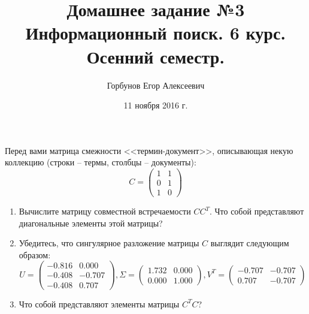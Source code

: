 
\makeatletter
{}
\makeatother
\graphicspath{{./pics/}}

\title{Домашнее задание №3 \\ Информационный поиск. 6 курс. Осенний семестр.}
\author{Горбунов Егор Алексеевич}
\date{11 ноября 2016 г.}

\maketitle

\begin{task}[1]
Перед вами матрица смежности <<термин-документ>>, описывающая некую коллекцию (строки -- термы, столбцы -- документы):
\begin{equation*}
	C = 
	\begin{pmatrix}
	1 & 1 \\
	0 & 1 \\
	1 & 0
	\end{pmatrix}
\end{equation*}
\begin{enumerate}
	\item Вычислите матрицу совместной встречаемости $CC^T$. Что собой представляют диагональные элементы этой матрицы?
	\item Убедитесь, что сингулярное разложение матрицы $C$ выглядит следующим образом:
	\begin{equation*}
		U = 
		\begin{pmatrix}
		 -0.816 & 0.000 \\
		 -0.408 & -0.707 \\
		 -0.408 & 0.707
		\end{pmatrix}
		,
		\Sigma =
		\begin{pmatrix}
		1.732 & 0.000 \\
		0.000 & 1.000
		\end{pmatrix}
		,
		V^T = 
		\begin{pmatrix}
		-0.707 & -0.707 \\
		0.707 & -0.707
		\end{pmatrix}
	\end{equation*}
	\item Что собой представляют элементы матрицы $C^TC$? \label{t1:item3} 
\end{enumerate}
\end{task}

